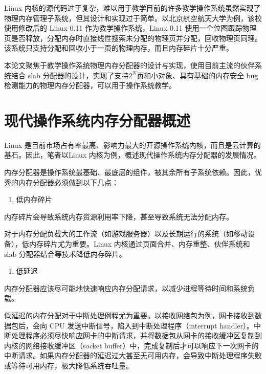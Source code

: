 \documentclass[AutoFakeBold]{LZUThesis}
\newcommand{\tightlist}{%
  \setlength{\itemsep}{0pt}\setlength{\parskip}{0pt}}
\begin{document}
\begin{sloppypar}
Linux 内核的源代码过于复杂，难以用于教学目前的许多教学操作系统虽然实现了物理内存管理子系统，但其设计和实现过于简单。以北京航空航天大学为例，该校使用修改后的 Linux 0.11 作为教学操作系统，Linux 0.11 使用一个位图跟踪物理页是否释放，分配内存时直接线性搜索未分配的物理页并分配，回收物理页同理。该系统只支持分配和回收小于一页的物理内存，而且内存碎片十分严重。

本论文聚焦于教学操作系统物理内存分配器的设计与实现，使用目前主流的伙伴系统结合 slab 分配器的设计，实现了支持$2^N$页和小对象、具有基础的内存安全 bug 检测能力的物理内存分配器，可以用于操作系统教学。



\section{现代操作系统内存分配器概述}

Linux
是目前市场占有率最高、影响力最大的开源操作系统内核，而且是云计算的基石。因此，笔者以Linux 内核为例，概述现代操作系统内存分配器的发展情况。

内存分配器是操作系统最基础、最底层的组件，被其余所有子系统依赖。因此，优秀的内存分配器必须做到以下几点：

\begin{enumerate}
\def\labelenumi{\arabic{enumi}.}
\tightlist
\item
  低内存碎片
\end{enumerate}

内存碎片会导致系统内存资源利用率下降，甚至导致系统无法分配内存。

对于内存分配负载大的工作流（如游戏服务器）以及长期运行的系统（如移动设备），低内存碎片尤为重要。Linux 内核通过页面合并、内存重整、伙伴系统和 slab 分配器结合等技术降低内存碎片。

\begin{enumerate}
\def\labelenumi{\arabic{enumi}.}
\setcounter{enumi}{1}
\tightlist
\item
  低延迟
\end{enumerate}

内存分配器应该尽可能地快速响应内存分配请求，以减少进程等待时间和系统负载。

低延迟的内存分配对于中断处理例程尤为重要。以接收网络包为例，网卡接收到数据包后，会向
CPU 发送中断信号，陷入到中断处理程序（interrupt
handler）。中断处理程序必须尽快响应网卡的中断请求，并将数据包从网卡的接收缓冲区复制到内核的网络接收缓冲区（socket
buffer）中，完成复制后才可以响应下一次网卡的中断请求。如果内存分配器的延迟过大甚至无可用内存，会导致中断处理程序失败或等待可用内存，极大降低系统吞吐量。


\end{sloppypar}
\end{document}
